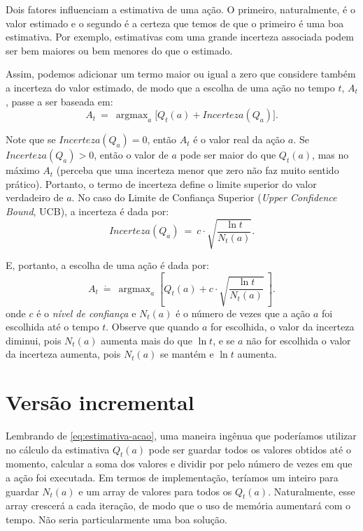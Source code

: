 \documentclass{article}
\DeclareMathOperator*{\argmax}{argmax}
\begin{document}
            Dois fatores influenciam a estimativa de uma ação. O primeiro, naturalmente, é o valor estimado e o segundo é a certeza que temos de que o primeiro é uma boa estimativa. Por exemplo, estimativas com uma grande incerteza associada podem ser bem maiores ou bem menores do que o estimado.
            
            Assim, podemos adicionar um termo maior ou igual a zero que considere também a incerteza do valor estimado, de modo que a escolha de uma ação no tempo $t$, $A_t$, passe a ser baseada em:            
            \begin{equation}
                A_t \ = \ \argmax_a \Big[ Q_t(a) + Incerteza(Q_a) \Big] .
            \end{equation}           
            
            Note que se $Incerteza(Q_a) = 0$, então $A_t$ é o valor real da ação $a$. Se $Incerteza(Q_a) > 0$, então o valor de $a$ pode ser maior do que $Q_t(a)$, mas no máximo $A_t$ (perceba que uma incerteza menor que zero não faz muito sentido prático). Portanto, o termo de incerteza define o limite superior do valor verdadeiro de $a$. No caso do Limite de Confiança Superior (\emph{Upper Confidence Bound}, UCB), a incerteza é dada por:            
            \begin{equation}
                Incerteza(Q_a) \ = \ c \cdot \sqrt{\frac{\ln{t}}{N_t(a)}} .
            \end{equation}
            
            E, portanto, a escolha de uma ação é dada por:            
            \begin{equation}
                A_t \ \dot{=} \ \argmax_a \left[ Q_t(a) + c \cdot \sqrt{\frac{\ln{t}}{N_t(a)}} \ \right] .
            \end{equation}            
            \noindent
            onde $c$ é o \emph{nível de confiança} e $N_t(a)$ é o número de vezes que a ação $a$ foi escolhida até o tempo $t$. Observe que quando $a$ for escolhida, o valor da incerteza diminui, pois $N_t(a)$ aumenta mais do que $\ln{t}$, e se $a$ não for escolhida o valor da incerteza aumenta, pois $N_t(a)$ se mantém e $\ln{t}$ aumenta.
            
    \section{Versão incremental}

        Lembrando de \eqref{eq:estimativa-acao}, uma maneira ingênua que poderíamos utilizar no cálculo da estimativa $Q_t(a)$ pode ser guardar todos os valores obtidos até o momento, calcular a soma dos valores e dividir por pelo número de vezes em que a ação foi executada. Em termos de implementação, teríamos um inteiro para guardar $N_t(a)$ e um array de valores para todos os $Q_t(a)$. Naturalmente, esse array crescerá a cada iteração, de modo que o uso de memória aumentará com o tempo. Não seria particularmente uma boa solução.
        
\end{document}

